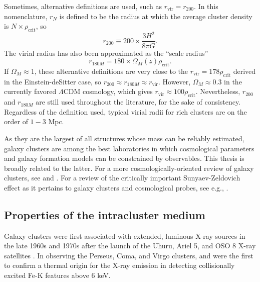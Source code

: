 Sometimes, alternative definitions are used, such as 
$r_\mathrm{vir}=r_{200}$. In this nomenclature, 
$r_N$ is defined to be the radius at which the average cluster density is $N \times \rho_\mathrm{crit}$, so
\begin{equation}
r_{200} \equiv 200 \times \frac{3H^2}{8\pi G}.
\end{equation}
The virial radius has also been approximated as the ``scale radius'' 
\begin{equation}
r_{180M} = 180 \times \Omega_M \left(z \right) \rho_\mathrm{crit}. 
\end{equation}
If $\Omega_M \approx 1$, these alternative definitions are 
very close to the $r_\mathrm{vir} = 178 \rho_\mathrm{crit}$ derived in the Einstein-deSitter case, so $r_{200} \approx r_{180M} \approx r_\mathrm{vir}$. However, $\Omega_M \approx 0.3$ in
the currently favored $\Lambda$CDM cosmology, which gives $r_\mathrm{vir} \approx 100 \rho_\mathrm{crit}$. Nevertheless, $r_\mathrm{200}$ and $r_{180M}$ are still 
used throughout the literature, for the sake of consistency.  
Regardless of the definition 
used, typical virial radii for rich clusters are on the order of $1-3$ Mpc.




As they are the largest of all structures whose mass can be reliably estimated, 
galaxy clusters are among the best laboratories in which cosmological parameters and
galaxy formation models can be constrained by observables.  
This thesis is broadly related to the latter. For a more cosmologically-oriented 
review of galaxy clusters, see \citet{rosati02} and \citet{voit05}. For a review of the critically important Sunyaev-Zeldovich effect 
\citep{sunyaev70,sunyaev72} as it pertains to galaxy clusters and cosmological probes, see e.g., \citet{carlstrom02}. 





\subsection{Properties of the intracluster medium}


Galaxy clusters were first associated with extended, luminous X-ray sources in the late 1960s and 1970s
after the launch of the Uhuru, Ariel 5, and OSO 8 X-ray satellites \citep{giacconi71,gursky71,forman72,mitchell76,gursky77,serlemitsos77}. 
In observing the Perseus, Coma, and Virgo clusters, \citet{mitchell76} and \citet{serlemitsos77} were the first to confirm a thermal origin for the X-ray emission
in detecting collisionally excited Fe-K features above 6 keV. 


